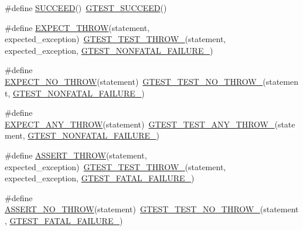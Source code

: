 \begin{DoxyCompactItemize}
\item 
\#define \hyperlink{fused-src_2gtest_2gtest_8h_a75adcdf89f69b0b615e395daafc315af}{\-S\-U\-C\-C\-E\-E\-D}()~\hyperlink{include_2gtest_2gtest_8h_a2690441c38202728f4159ac2462d9720}{\-G\-T\-E\-S\-T\-\_\-\-S\-U\-C\-C\-E\-E\-D}()
\item 
\#define \hyperlink{fused-src_2gtest_2gtest_8h_a789842b4475eed948e6fd18390d5a859}{\-E\-X\-P\-E\-C\-T\-\_\-\-T\-H\-R\-O\-W}(statement, expected\-\_\-exception)~\hyperlink{gtest-internal_8h_a3f71db93eaf30b0cfca9612b9ac32106}{\-G\-T\-E\-S\-T\-\_\-\-T\-E\-S\-T\-\_\-\-T\-H\-R\-O\-W\-\_\-}(statement, expected\-\_\-exception, \hyperlink{gtest-internal_8h_a6cb7482cfa03661a91c698eb5895f642}{\-G\-T\-E\-S\-T\-\_\-\-N\-O\-N\-F\-A\-T\-A\-L\-\_\-\-F\-A\-I\-L\-U\-R\-E\-\_\-})
\item 
\#define \hyperlink{fused-src_2gtest_2gtest_8h_a2743a1438137ad857aa3f9fec3ff67ec}{\-E\-X\-P\-E\-C\-T\-\_\-\-N\-O\-\_\-\-T\-H\-R\-O\-W}(statement)~\hyperlink{gtest-internal_8h_a9a109d026b5a904646437d7570e13581}{\-G\-T\-E\-S\-T\-\_\-\-T\-E\-S\-T\-\_\-\-N\-O\-\_\-\-T\-H\-R\-O\-W\-\_\-}(statement, \hyperlink{gtest-internal_8h_a6cb7482cfa03661a91c698eb5895f642}{\-G\-T\-E\-S\-T\-\_\-\-N\-O\-N\-F\-A\-T\-A\-L\-\_\-\-F\-A\-I\-L\-U\-R\-E\-\_\-})
\item 
\#define \hyperlink{fused-src_2gtest_2gtest_8h_a9be43f44d148e8a8d6a89c864bf4e461}{\-E\-X\-P\-E\-C\-T\-\_\-\-A\-N\-Y\-\_\-\-T\-H\-R\-O\-W}(statement)~\hyperlink{gtest-internal_8h_af48bbd26d54d4afc5e4cef39b1c76ba3}{\-G\-T\-E\-S\-T\-\_\-\-T\-E\-S\-T\-\_\-\-A\-N\-Y\-\_\-\-T\-H\-R\-O\-W\-\_\-}(statement, \hyperlink{gtest-internal_8h_a6cb7482cfa03661a91c698eb5895f642}{\-G\-T\-E\-S\-T\-\_\-\-N\-O\-N\-F\-A\-T\-A\-L\-\_\-\-F\-A\-I\-L\-U\-R\-E\-\_\-})
\item 
\#define \hyperlink{fused-src_2gtest_2gtest_8h_aedb1eddae6c2a2430b0e7b7e03b4f052}{\-A\-S\-S\-E\-R\-T\-\_\-\-T\-H\-R\-O\-W}(statement, expected\-\_\-exception)~\hyperlink{gtest-internal_8h_a3f71db93eaf30b0cfca9612b9ac32106}{\-G\-T\-E\-S\-T\-\_\-\-T\-E\-S\-T\-\_\-\-T\-H\-R\-O\-W\-\_\-}(statement, expected\-\_\-exception, \hyperlink{gtest-internal_8h_a0f9a4c3ea82cc7bf4478eaffdc168358}{\-G\-T\-E\-S\-T\-\_\-\-F\-A\-T\-A\-L\-\_\-\-F\-A\-I\-L\-U\-R\-E\-\_\-})
\item 
\#define \hyperlink{fused-src_2gtest_2gtest_8h_a895c34d9b192cdc2ba46d2680623485d}{\-A\-S\-S\-E\-R\-T\-\_\-\-N\-O\-\_\-\-T\-H\-R\-O\-W}(statement)~\hyperlink{gtest-internal_8h_a9a109d026b5a904646437d7570e13581}{\-G\-T\-E\-S\-T\-\_\-\-T\-E\-S\-T\-\_\-\-N\-O\-\_\-\-T\-H\-R\-O\-W\-\_\-}(statement, \hyperlink{gtest-internal_8h_a0f9a4c3ea82cc7bf4478eaffdc168358}{\-G\-T\-E\-S\-T\-\_\-\-F\-A\-T\-A\-L\-\_\-\-F\-A\-I\-L\-U\-R\-E\-\_\-})

\end{DoxyCompactItemize}
